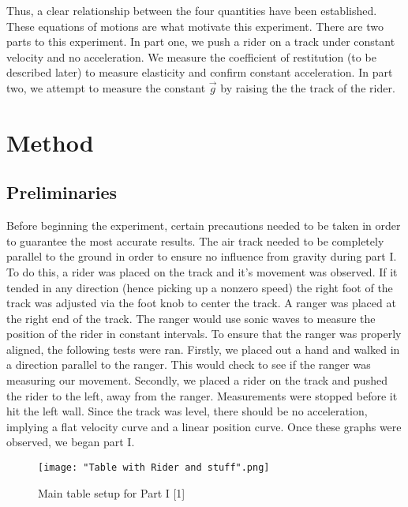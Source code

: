 \documentclass[journal,transmag]{IEEEtran}
\begin{document}
Thus, a clear relationship between the four quantities have been established. These equations of motions are what motivate this experiment. There are two parts to this experiment. In part one, we push a rider on a track under constant velocity and no acceleration. We measure the coefficient of restitution (to be described later) to measure elasticity and confirm constant acceleration. In part two, we attempt to measure the constant $\Vec{g}$ by raising the the track of the rider. 






\section{Method}
\begin{center}
    \subsection{Preliminaries}
\end{center} %

\indent Before beginning the experiment, certain precautions needed to be taken in order to guarantee the most accurate results. The air track needed to be completely parallel to the ground in order to ensure no influence from gravity during part I. To do this, a rider was placed on the track and it's movement was observed. If it tended in any direction (hence picking up a nonzero speed) the right foot of the track was adjusted via the foot knob to center the track.
\indent A ranger was placed at the right end of the track. The ranger would use sonic waves to measure the position of the rider in constant intervals. To ensure that the ranger was properly aligned, the following tests were ran. Firstly, we placed out a hand and walked in a direction parallel to the ranger. This would check to see if the ranger was measuring our movement. Secondly, we placed a rider on the track and pushed the rider to the left, away from the ranger. Measurements were stopped before it hit the left wall. Since the track was level, there should be no acceleration, implying a flat velocity curve and a linear position curve. Once these graphs were observed, we began part I.

\begin{figure}[h]
\caption{Main table setup for Part I [1]}
\centering
\texttt{[image: "Table with Rider and stuff".png]}
\end{figure}
\end{document}
